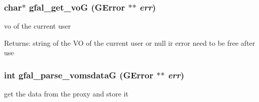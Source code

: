 \subsubsection{\setlength{\rightskip}{0pt plus 5cm}char$\ast$ gfal\_\-get\_\-vo\-G (GError $\ast$$\ast$ {\em err})}\label{gfal__voms__if_8c_04de197cd3250df8552015a45d0c7d24}


vo of the current user 

\begin{Desc}
\item[Returns:]string of the VO of the current user or null ir error need to be free after use \end{Desc}
\subsubsection{\setlength{\rightskip}{0pt plus 5cm}int gfal\_\-parse\_\-vomsdata\-G (GError $\ast$$\ast$ {\em err})}\label{gfal__voms__if_8c_fad846d1ae353ebf568469b4d15cab50}


get the data from the proxy and store it 